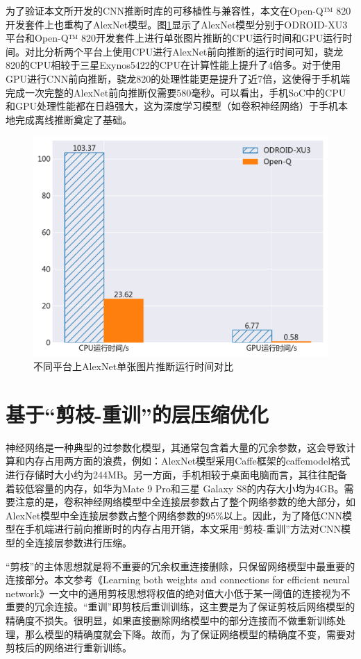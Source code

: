 为了验证本文所开发的CNN推断时库的可移植性与兼容性，本文在Open-Q™ 820开发套件上也重构了AlexNet模型。图\ref{figure:figure19}显示了AlexNet模型分别于ODROID-XU3平台和Open-Q™ 820开发套件上进行单张图片推断的CPU运行时间和GPU运行时间。对比分析两个平台上使用CPU进行AlexNet前向推断的运行时间可知，骁龙820的CPU相较于三星Exynos5422的CPU在计算性能上提升了4倍多。对于使用GPU进行CNN前向推断，骁龙820的处理性能更是提升了近7倍，这使得于手机端完成一次完整的AlexNet前向推断仅需要580毫秒。可以看出，手机SoC中的CPU和GPU处理性能都在日趋强大，这为深度学习模型（如卷积神经网络）于手机本地完成离线推断奠定了基础。

\begin{figure}[htbp]
    \centering
    \includegraphics[height=0.4\textwidth]{figures/open_q.pdf}
    \caption{不同平台上AlexNet单张图片推断运行时间对比}\label{figure:figure19}
\end{figure}


\section{基于“剪枝-重训”的层压缩优化}

神经网络是一种典型的过参数化模型，其通常包含着大量的冗余参数，这会导致计算和内存占用两方面的浪费，例如：AlexNet模型采用Caffe框架的caffemodel格式进行存储时大小约为244MB。另一方面，手机相较于桌面电脑而言，其往往配备着较低容量的内存，如华为Mate 9 Pro和三星 Galaxy S8的内存大小均为4GB。需要注意的是，卷积神经网络模型中全连接层参数占了整个网络参数的绝大部分，如AlexNet模型中全连接层参数占整个网络参数的95\%以上。因此，为了降低CNN模型在手机端进行前向推断时的内存占用开销，本文采用“剪枝-重训”方法对CNN模型的全连接层参数进行压缩。

“剪枝”的主体思想就是将不重要的冗余权重连接删除，只保留网络模型中最重要的连接部分。本文参考《Learning both weights and connections for efficient neural network》\cite{han2015learning}一文中的通用剪枝思想将权值的绝对值大小低于某一阈值的连接视为不重要的冗余连接。“重训”即剪枝后重训训练，这主要是为了保证剪枝后网络模型的精确度不损失。很明显，如果直接删除网络模型中的部分连接而不做重新训练处理，那么模型的精确度就会下降。故而，为了保证网络模型的精确度不变，需要对剪枝后的网络进行重新训练。

